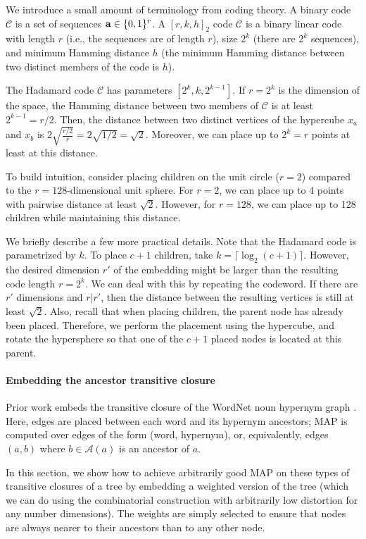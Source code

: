 We introduce a small amount of terminology from coding theory. A binary code $\mathcal{C}$ is a set of sequences ${\bf a} \in \{0,1\}^r$. A $[r,k,h]_2$ code $\mathcal{C}$ is a binary linear code with length $r$ (i.e., the sequences are of length $r$), size $2^k$ (there are $2^k$ sequences), and minimum Hamming distance $h$ (the minimum Hamming distance between two distinct members of the code is $h$). 

The Hadamard code $\mathcal{C}$ has parameters $[2^k, k, 2^{k-1}]$. If $r=2^k$ is the dimension of the space, the Hamming distance between two members of $\mathcal{C}$ is at least $2^{k-1} = r/2$. Then, the distance between two distinct vertices of the hypercube ${ x}_{ a}$ and ${ x}_{ b}$ is $2\sqrt{\frac{r/2}{r}} = 2\sqrt{1/2} = \sqrt{2}$. Moreover, we can place up to $2^k=r$ points at least at this distance.

To build intuition, consider placing children on the unit circle ($r=2$) compared to the $r=128$-dimensional unit sphere. For $r=2$, we can place up to 4 points with pairwise distance at least $\sqrt{2}$. However, for $r=128$, we can place up to 128 children while maintaining this distance.

We briefly describe a few more practical details. Note that the Hadamard code is parametrized by $k$. To place $c+1$ children, take $k = \lceil \log_2(c+1) \rceil$. However, the desired dimension $r'$ of the embedding might be larger than the resulting code length $r=2^k$. We can deal with this by repeating the codeword. If there are $r'$ dimensions and $r|r'$, then the distance between the resulting vertices is still at least $\sqrt{2}$. Also, recall that when placing children, the parent node has already been placed. Therefore, we perform the placement using the hypercube, and rotate the hypersphere so that one of the $c+1$ placed nodes is located at this parent. 


\paragraph{Embedding the ancestor transitive closure}
Prior work embeds the transitive closure of the WordNet noun hypernym graph \cite{fb}. Here, edges are placed between each word and its hypernym ancestors; MAP is computed over edges of the form (word, hypernym), or, equivalently, edges $(a,b)$ where $b\in \mathcal{A}(a)$ is an ancestor of $a$.

In this section, we show how to achieve arbitrarily good MAP on these types of transitive closures of a tree by embedding a weighted version of the tree (which we can do using the combinatorial construction with arbitrarily low distortion for any number dimensions). The weights are simply selected to ensure that nodes are always nearer to their ancestors than to any other node.

